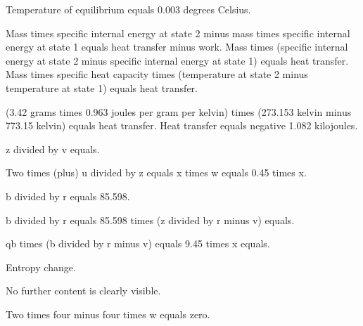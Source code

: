 Temperature of equilibrium equals 0.003 degrees Celsius.  

Mass times specific internal energy at state 2 minus mass times specific internal energy at state 1 equals heat transfer minus work.  
Mass times (specific internal energy at state 2 minus specific internal energy at state 1) equals heat transfer.  
Mass times specific heat capacity times (temperature at state 2 minus temperature at state 1) equals heat transfer.  

(3.42 grams times 0.963 joules per gram per kelvin) times (273.153 kelvin minus 773.15 kelvin) equals heat transfer.  
Heat transfer equals negative 1.082 kilojoules.

z divided by v equals.  

Two times (plus) u divided by z equals x times w equals 0.45 times x.  

b divided by r equals 85.598.  

b divided by r equals 85.598 times (z divided by r minus v) equals.  

qb times (b divided by r minus v) equals 9.45 times x equals.  

Entropy change.  

No further content is clearly visible.

Two times four minus four times w equals zero.